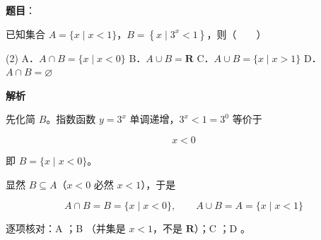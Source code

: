 \begin{answer}

\textbf{题目}：

已知集合 $A=\{x\mid x<1\}$，$B=\left\{x\mid3^{x}<1\right\}$，则\mbox{（　　）}

\begin{gkopts}(2)
\task A．$A\cap B=\{x\mid x<0\}$
\task B．$A\cup B=\mathbf R$
\task C．$A\cup B=\{x\mid x>1\}$
\task D．$A\cap B=\varnothing$
\end{gkopts}

\textbf{解析}

先化简 $B$。指数函数 $y=3^{x}$ 单调递增，$3^{x}<1=3^{0}$ 等价于

\nopagebreak[4]
\[x<0\]

即 $B=\{x\mid x<0\}$。

显然 $B\subseteq A$（$x<0$ 必然 $x<1$），于是

\nopagebreak[4]
\[A\cap B=B=\{x\mid x<0\},\qquad A\cup B=A=\{x\mid x<1\}\]

逐项核对：A ；B （并集是 $x<1$，不是 $\mathbf R$）；C ；D 。


\par\medskip

\end{answer}
